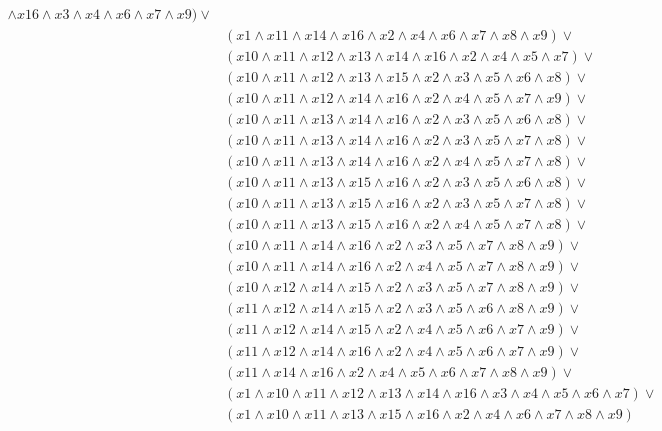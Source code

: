 \documentclass{article}
\begin{document}
\begin{enumerate}
\begin{equation*}
\begin{aligned}
\land x16 \land x3 \land x4 \land x6 \land x7 \land x9) \lor \\ & (x1 \land x11 \land x14 \land x16 \land x2 \land x4 \land x6 \land x7 \land x8 \land x9) \lor \\ & (x10 \land x11 \land x12 \land x13 \land x14 \land x16 \land x2 \land x4 \land x5 \land x7) \lor \\ & (x10 \land x11 \land x12 \land x13 \land x15 \land x2 \land x3 \land x5 \land x6 \land x8) \lor \\ & (x10 \land x11 \land x12 \land x14 \land x16 \land x2 \land x4 \land x5 \land x7 \land x9) \lor \\ & (x10 \land x11 \land x13 \land x14 \land x16 \land x2 \land x3 \land x5 \land x6 \land x8) \lor \\ & (x10 \land x11 \land x13 \land x14 \land x16 \land x2 \land x3 \land x5 \land x7 \land x8) \lor \\ & (x10 \land x11 \land x13 \land x14 \land x16 \land x2 \land x4 \land x5 \land x7 \land x8) \lor \\ & (x10 \land x11 \land x13 \land x15 \land x16 \land x2 \land x3 \land x5 \land x6 \land x8) \lor \\ & (x10 \land x11 \land x13 \land x15 \land x16 \land x2 \land x3 \land x5 \land x7 \land x8) \lor \\ & (x10 \land x11 \land x13 \land x15 \land x16 \land x2 \land x4 \land x5 \land x7 \land x8) \lor \\ & (x10 \land x11 \land x14 \land x16 \land x2 \land x3 \land x5 \land x7 \land x8 \land x9) \lor \\ & (x10 \land x11 \land x14 \land x16 \land x2 \land x4 \land x5 \land x7 \land x8 \land x9) \lor \\ & (x10 \land x12 \land x14 \land x15 \land x2 \land x3 \land x5 \land x7 \land x8 \land x9) \lor \\ & (x11 \land x12 \land x14 \land x15 \land x2 \land x3 \land x5 \land x6 \land x8 \land x9) \lor \\ & (x11 \land x12 \land x14 \land x15 \land x2 \land x4 \land x5 \land x6 \land x7 \land x9) \lor \\ & (x11 \land x12 \land x14 \land x16 \land x2 \land x4 \land x5 \land x6 \land x7 \land x9) \lor \\ & (x11 \land x14 \land x16 \land x2 \land x4 \land x5 \land x6 \land x7 \land x8 \land x9) \lor \\ & (x1 \land x10 \land x11 \land x12 \land x13 \land x14 \land x16 \land x3 \land x4 \land x5 \land x6 \land x7) \lor \\ & (x1 \land x10 \land x11 \land x13 \land x15 \land x16 \land x2 \land x4 \land x6 \land x7 \land x8 \land x9)
\end{aligned}
\end{equation*}
\end{enumerate}
\end{document}

